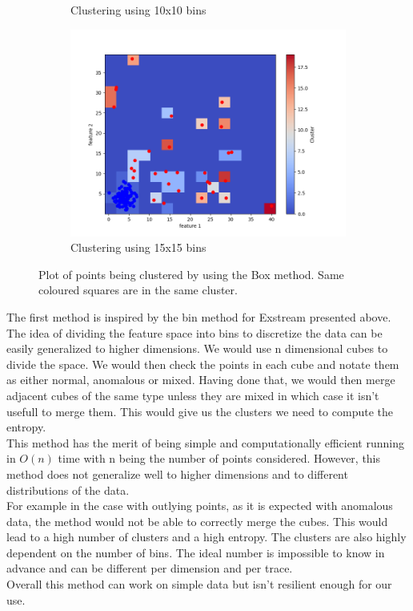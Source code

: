 \documentclass[oneside, a4paper, onecolumn, 11pt]{article}
\begin{document}
\begin{figure}[H]
\begin{subfigure}{0.35\textwidth}
      \caption{Clustering using 10x10 bins}
  \end{subfigure}
  \hfill
  \begin{subfigure}{0.35\textwidth}
      \centering
      \includegraphics[width=\linewidth]{images/bad clustercube1.png}
      \caption{Clustering using 15x15 bins}
  \end{subfigure}
  \caption{Plot of points being clustered by using the Box method. Same coloured squares are in the same cluster.}
\end{figure}
The first method is inspired by the bin method for Exstream \cite{MijaExstream} presented above. The idea of dividing the feature space into bins to discretize the data can be easily generalized to higher dimensions. We would use n dimensional cubes to divide the space. We would then check the points in each cube and notate them as either normal, anomalous or mixed. Having done that, we would then merge adjacent cubes of the same type unless they are mixed in which case it isn't usefull to merge them. This would give us the clusters we need to compute the entropy.\\
This method has the merit of being simple and computationally efficient running in $O(n)$ time with n being the number of points considered. However, this method does not generalize well to higher dimensions and to different distributions of the data.\\
For example in the case with outlying points, as it is expected with anomalous data, the method would not be able to correctly merge the cubes. This would lead to a high number of clusters and a high entropy. The clusters are also highly dependent on the number of bins. The ideal number is impossible to know in advance and can be different per dimension and per trace.\\
Overall this method can work on simple data but isn't resilient enough for our use.\\
\end{document}
